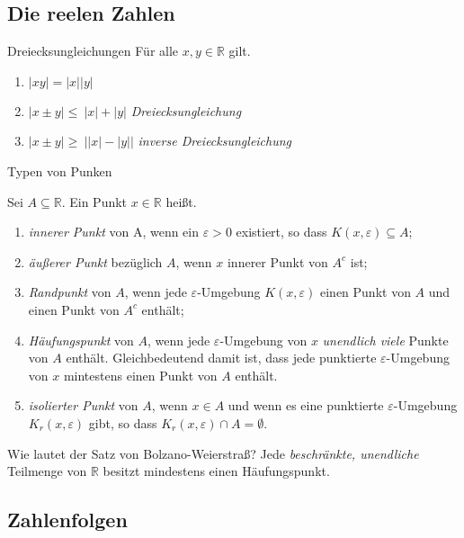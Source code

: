 \subsection{Die reelen Zahlen}

\begin{karte}{Dreiecksungleichungen}
	Für alle \(x,y \in \mathbb{R}\) gilt.
	\begin{enumerate}[label=\(\triangleright \)]
		\item \(\lvert xy    \rvert =      		\lvert x\rvert    \lvert y\rvert  \)
		\item \(\lvert x\pm y\rvert \leq\  		\lvert x\rvert +  \lvert y\rvert  \)  \dotfill \emph{Dreiecksungleichung}
		\item \(\lvert x\pm y\rvert \geq\ \lvert\lvert x\rvert -  \lvert y\rvert\rvert \)  \dotfill \emph{inverse Dreiecksungleichung}


	\end{enumerate}
\end{karte}

\begin{karte}{Typen von Punken}
	{\large
		Sei \(A \subseteq \mathbb{R}\). Ein Punkt \(x \in \mathbb{R}\) heißt.
		\begin{enumerate}[label=$\triangleright$]
			\item \emph{innerer Punkt} von A, wenn ein \(\varepsilon > 0\) existiert, so dass \(K(x,\varepsilon) 		\subseteq A\);
			\item \emph{äußerer Punkt} bezüglich \(A\), wenn \(x\) innerer Punkt von \(A^c\) ist;
			\item \emph{Randpunkt} von \(A\), wenn  jede \(\varepsilon \)-Umgebung \(K(x,\varepsilon)\) einen Punkt von \(A\) und einen Punkt von \(A^c\) enthält;
			\item \emph{Häufungspunkt} von \(A\), wenn jede \(\varepsilon \)-Umgebung von \( x \) \emph{unendlich viele} Punkte von \(A\) enthält. Gleichbedeutend damit ist, dass jede punktierte \(\varepsilon \)-Umgebung von \(x\) mintestens einen Punkt von \(A\) enthält.
			\item \emph{isolierter Punkt} von \(A\), wenn \(x \in A \) und  wenn es eine punktierte \(\varepsilon \)-Umgebung \(K_{r}(x,\varepsilon)\) gibt, so dass \(K_{r}(x,\varepsilon) \cap A = \emptyset \).

		\end{enumerate}
	}

\end{karte}


\begin{karte}{Wie lautet der Satz von Bolzano-Weierstraß?}
	Jede \emph{beschränkte, unendliche} Teilmenge von \(\mathbb{R}\) besitzt mindestens einen Häufungspunkt.
\end{karte}
\subsection{Zahlenfolgen}

